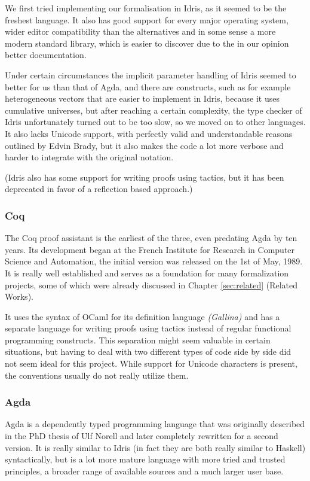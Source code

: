 We first tried implementing our formalisation in Idris, as it seemed to be the freshest language. It also has good support for every major operating system, wider editor compatibility than the alternatives and in some sense a more modern standard library, which is easier to discover due to the in our opinion better documentation.

Under certain circumstances the implicit parameter handling of Idris seemed to better for us than that of Agda, and there are constructs, such as for example heterogeneous vectors that are easier to implement in Idris, because it uses cumulative universes, but after reaching a certain complexity, the type checker of Idris unfortunately turned out to be too slow, so we moved on to other languages. It also lacks Unicode support, with perfectly valid and understandable reasons outlined by Edvin Brady, but it also makes the code a lot more verbose and harder to integrate with the original notation.

(Idris also has some support for writing proofs using tactics, but it has been deprecated in favor of a reflection based approach.)

\subsubsection{Coq}
The Coq proof assistant\cite{the_coq_development_team_2020_3744225}\cite{Coq} is the earliest of the three, even predating Agda by ten years. Its development began at the French Institute for Research in Computer Science and Automation, the initial version was released on the 1st of May, 1989. It is really well established and serves as a foundation for many formalization projects, some of which were already discussed in Chapter \ref{sec:related} (Related Works). 

It uses the syntax of OCaml for its definition language \textit{(Gallina)} and has a separate language for writing proofs using tactics instead of regular functional programming constructs. This separation might seem valuable in certain situations, but having to deal with two different types of code side by side did not seem ideal for this project. While support for Unicode characters is present, the conventions usually do not really utilize them.

\subsubsection{Agda}
Agda\cite{agda} is a dependently typed programming language that was originally described in the PhD thesis of Ulf Norell\cite{norell:thesis} and later completely rewritten for a second version. It is really similar to Idris (in fact they are both really similar to Haskell) syntactically, but is a lot more mature language with more tried and trusted principles, a broader range of available sources and a much larger user base.

